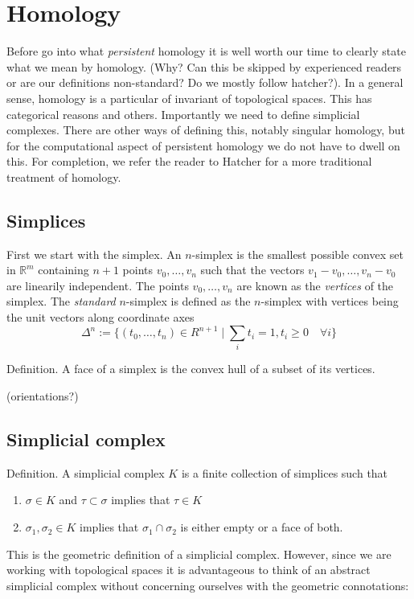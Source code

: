 \chapter{Homology}
Before go into what \textit{persistent} homology it is well worth our time to clearly state what we mean by homology. (Why? Can this be skipped by experienced readers or are our definitions non-standard? Do we mostly follow hatcher?). In a general sense, homology is a particular of invariant of topological spaces. This has categorical reasons and others.
Importantly we need to define simplicial complexes. There are other ways of defining this, notably singular homology, but for the computational aspect of persistent homology we do not have to dwell on this. For completion, we refer the reader to Hatcher for a more traditional treatment of homology.

\section{Simplices}
First we start with the simplex.
An $n$-simplex is the smallest possible convex set in $\mathbb{R}^{m}$ containing $n+1$ points $v_{0},\dots,v_{n}$ such that the vectors $v_{1}-v_{0}, \dots, v_{n} - v_{0}$ are linearily independent. The points $v_{0},\dots,v_{n}$ are known as the \textit{vertices} of the simplex.
The \textit{standard} $n$-simplex is defined as the $n$-simplex with vertices being the unit vectors along coordinate axes
\[ \Delta^{n} := \{ (t_{0}, \dots, t_{n}) \in R^{n+1} \mid \sum_{i} t_{i} = 1, t_{i} \geq 0 \quad \forall i \}
\]

Definition. A face of a simplex is the convex hull of a subset of its vertices.

(orientations?)
\section{Simplicial complex}

Definition. A simplicial complex $K$ is a finite collection of simplices such that
\begin{enumerate}
    \item $\sigma \in K$ and $\tau \subset \sigma$ implies that $\tau \in K$
    \item $\sigma_{1}, \sigma_{2} \in K$ implies that $\sigma_{1} \cap \sigma_{2}$ is either empty or a face of both.
\end{enumerate}
This is the geometric definition of a simplicial complex. However, since we are working with topological spaces it is advantageous to think of an abstract simplicial complex without concerning ourselves with the geometric connotations:

